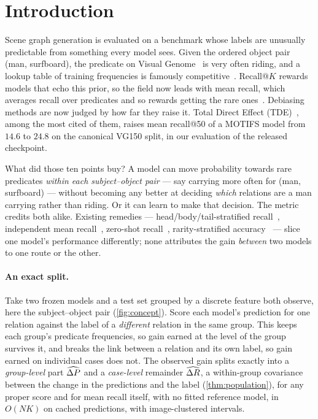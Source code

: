 \section{Introduction}\label{sec:intro}

Scene graph generation is evaluated on a benchmark whose labels are unusually predictable
from something every model sees. Given the ordered object pair (\textsf{man},
\textsf{surfboard}), the predicate on Visual Genome~\cite{krishna2017visual} is very often
\textsf{riding}, and a lookup table of training frequencies is famously
competitive~\cite{zellers2018neural}. Recall@$K$ rewards models that echo this prior, so the
field now leads with mean recall, which averages recall over predicates and so rewards getting
the rare ones~\cite{chen2019kern,tang2019vctree}. Debiasing methods are now judged by how far they raise it.
Total Direct Effect (TDE)~\cite{tang2020unbiased}, among the most cited of them, raises
mean recall@50 of a MOTIFS model from $14.6$ to $24.8$ on the canonical VG150 split, in our
evaluation of the released checkpoint.

What did those ten points buy? A model can move probability towards rare predicates
\emph{within each subject--object pair} --- say \textsf{carrying} more often for
(\textsf{man}, \textsf{surfboard}) --- without becoming any better at deciding \emph{which}
relations are a man carrying rather than riding. Or it can learn to make that decision. The
metric credits both alike. Existing remedies --- head/body/tail-stratified
recall~\cite{li2021bgnn}, independent mean recall~\cite{li2022rethinking}, zero-shot
recall~\cite{lu2016visual}, rarity-stratified accuracy~\cite{kervadec2021roses} --- slice one
model's performance differently; none attributes the gain \emph{between} two models to one
route or the other.

\paragraph{An exact split.} Take two frozen models and a test set grouped by a discrete
feature both observe, here the subject--object pair (\cref{fig:concept}). Score each model's
prediction for one relation against the label of a \emph{different} relation in the same
group. This keeps each group's predicate frequencies, so gain earned at the level of the group
survives it, and breaks the link between a relation and its own label, so gain earned on
individual cases does not. The observed gain splits exactly into a \emph{group-level} part
$\widehat{\Delta P}$ and a \emph{case-level} remainder $\widehat{\Delta R}$, a within-group covariance between the change
in the predictions and the label (\cref{thm:population}), for any proper score and for mean
recall itself, with no fitted reference model, in $O(NK)$ on cached predictions, with
image-clustered intervals.

